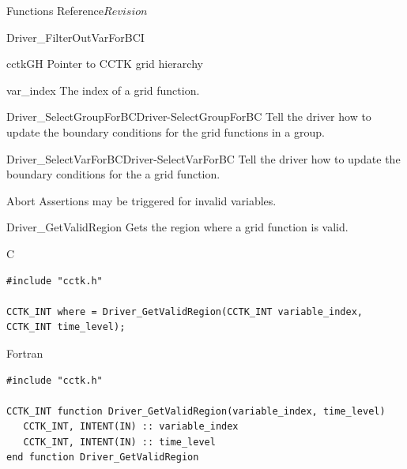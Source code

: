 \begin{cactuspart}{ Functions Reference}{}{$Revision$}
\begin{FunctionDescription}{Driver\_FilterOutVarForBCI}
\begin{ParameterSection}
\begin{Parameter}{cctkGH}
Pointer to CCTK grid hierarchy
\end{Parameter}

\begin{Parameter}{var\_index}
The index of a grid function.
\end{Parameter}
\end{ParameterSection}

\begin{SeeAlsoSection}
\begin{SeeAlso2}{Driver\_SelectGroupForBC}{Driver-SelectGroupForBC}
Tell the driver how to update the boundary conditions for the grid functions in a group.
\end{SeeAlso2}
\begin{SeeAlso2}{Driver\_SelectVarForBC}{Driver-SelectVarForBC}
Tell the driver how to update the boundary conditions for the a grid function.
\end{SeeAlso2}
\end{SeeAlsoSection}

\begin{ErrorSection}
\begin{Error}{Abort}
Assertions may be triggered for invalid variables.
\end{Error}
\end{ErrorSection}
\end{FunctionDescription}

\begin{FunctionDescription}{Driver\_GetValidRegion}
\label{Driver-GetValidRegion}
Gets the region where a grid function is valid.
\begin{SynopsisSection}
\begin{Synopsis}{C}
\begin{verbatim}
#include "cctk.h"

CCTK_INT where = Driver_GetValidRegion(CCTK_INT variable_index, CCTK_INT time_level);

\end{verbatim}
\end{Synopsis}
\begin{Synopsis}{Fortran}
\begin{verbatim}
#include "cctk.h"

CCTK_INT function Driver_GetValidRegion(variable_index, time_level)
   CCTK_INT, INTENT(IN) :: variable_index
   CCTK_INT, INTENT(IN) :: time_level
end function Driver_GetValidRegion
\end{verbatim}
\end{Synopsis}
\end{SynopsisSection}


\end{FunctionDescription}
\end{cactuspart}

